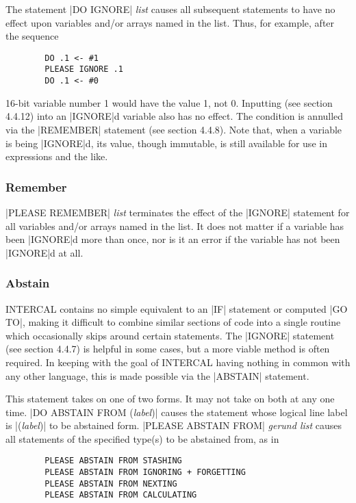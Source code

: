 The statement |DO IGNORE| {\em list} causes all subsequent statements to
have no effect upon variables and/or arrays named in the list.  Thus, for
example, after the sequence

\begin{verbatim}
        DO .1 <- #1
        PLEASE IGNORE .1
        DO .1 <- #0
\end{verbatim}
16-bit variable number 1 would have the value 1, not 0.  Inputting (see
section 4.4.12) into an |IGNORE|d variable also has no effect.  The
condition is annulled via the |REMEMBER| statement (see section 4.4.8).
Note that, when a variable is being |IGNORE|d, its value, though immutable,
is still available for use in expressions and the like.

\subsubsection{Remember}

|PLEASE REMEMBER| {\em list} terminates the effect of the |IGNORE|
statement for all variables and/or arrays named in the list.  It does not
matter if a variable has been |IGNORE|d more than once, nor is it an error
if the variable has not been |IGNORE|d at all.

\subsubsection{Abstain}

INTERCAL contains no simple equivalent to an |IF| statement or computed |GO
TO|, making it difficult to combine similar sections of code into a single
routine which occasionally skips around certain statements.  The |IGNORE|
statement (see section 4.4.7) is helpful in some cases, but a more viable
method is often required.  In keeping with the goal of INTERCAL having
nothing in common with any other language, this is made possible via the
|ABSTAIN| statement.

This statement takes on one of two forms.  It may not take on both at any
one time.  |DO ABSTAIN FROM ({\em label})| causes the statement whose
logical line label is |({\em label})| to be abstained form.  |PLEASE
ABSTAIN FROM| {\em gerund list} causes all statements of the specified
type(s) to be abstained from, as in

\begin{verbatim}
        PLEASE ABSTAIN FROM STASHING
        PLEASE ABSTAIN FROM IGNORING + FORGETTING
        PLEASE ABSTAIN FROM NEXTING
        PLEASE ABSTAIN FROM CALCULATING
\end{verbatim}


